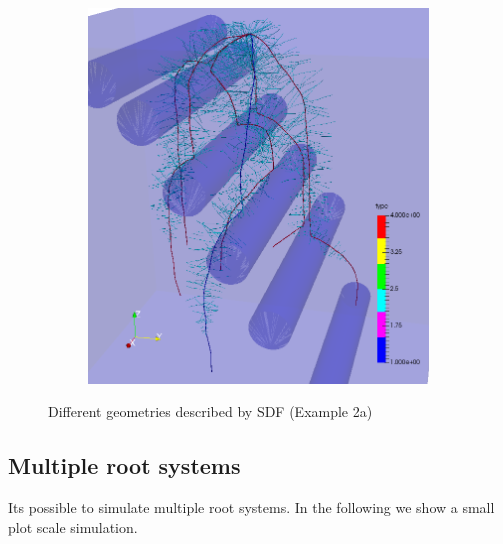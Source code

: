 \begin{figure}
\begin{subfigure}[c]{0.3\textwidth}
 \label{fig:split}
\end{subfigure}
\begin{subfigure}[c]{0.3\textwidth}
\includegraphics[width=0.99\textwidth]{example_2a3.png}
 \label{fig:rhizotubes}
\end{subfigure}
\caption{Different geometries described by SDF (Example 2a)}
\end{figure}

\subsection{Multiple root systems}

Its possible to simulate multiple root systems. In the following we show a small plot scale simulation.



